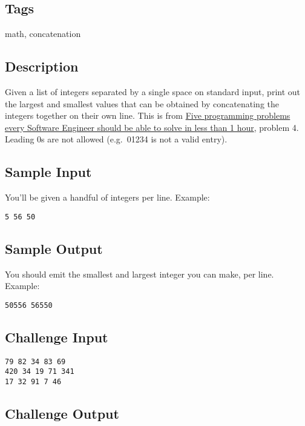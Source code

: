 \subsection{Tags}\label{tags-20}

math, concatenation

\subsection{Description}\label{description-20}

Given a list of integers separated by a single space on standard input,
print out the largest and smallest values that can be obtained by
concatenating the integers together on their own line. This is from
\href{https://blog.svpino.com/2015/05/07/five-programming-problems-every-software-engineer-should-be-able-to-solve-in-less-than-1-hour}{Five
programming problems every Software Engineer should be able to solve in
less than 1 hour}, problem 4. Leading 0s are not allowed (e.g.~01234 is
not a valid entry).

\subsection{Sample Input}\label{sample-input-1}

You'll be given a handful of integers per line. Example:

\begin{verbatim}
5 56 50
\end{verbatim}

\subsection{Sample Output}\label{sample-output-1}

You should emit the smallest and largest integer you can make, per line.
Example:

\begin{verbatim}
50556 56550
\end{verbatim}

\subsection{Challenge Input}\label{challenge-input-14}

\begin{verbatim}
79 82 34 83 69
420 34 19 71 341
17 32 91 7 46
\end{verbatim}

\subsection{Challenge Output}\label{challenge-output-11}

